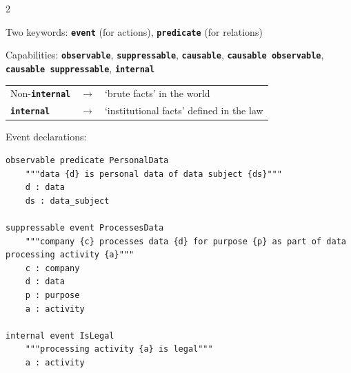 \documentclass[a4paper,9pt]{extarticle}
\newcommand{\kw}[1]{{\color{magenta}\texttt{\bfseries\upshape #1}}}
\begin{document}
\begin{multicols}{2}
    \begin{tcolorbox}[title={\bfseries 3 \quad Events}, colframe=blue!75!black, left=1pt, right=1pt]    
      Two keywords: \kw{event} (for actions), \kw{predicate} (for relations)

      \bigskip

      Capabilities: \kw{observable}, \kw{suppressable}, \kw{causable}, \kw{causable observable},
      \kw{causable suppressable}, \kw{internal}

      \bigskip

      \hspace{-1em}
      \begin{tabular}{lll}
        Non-\kw{internal} & $\to$ & `brute facts' in the world\\
        \kw{internal} & $\to$ &`institutional facts' defined in the law
      \end{tabular}

      \bigskip

      Event declarations:
\begin{lstlisting}
observable predicate PersonalData
    """data {d} is personal data of data subject {ds}"""
    d : data
    ds : data_subject

suppressable event ProcessesData
    """company {c} processes data {d} for purpose {p} as part of data processing activity {a}"""
    c : company
    d : data
    p : purpose
    a : activity

internal event IsLegal
    """processing activity {a} is legal"""
    a : activity
\end{lstlisting}
      \vspace{-1em}
    \end{tcolorbox}


\end{multicols}
\end{document}
